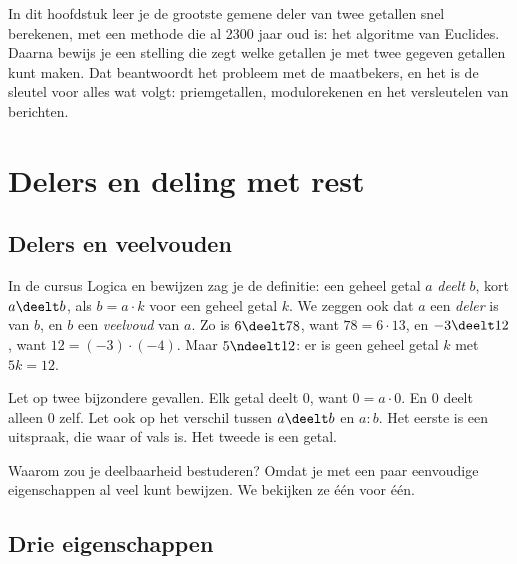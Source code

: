 In dit hoofdstuk leer je de grootste gemene deler van twee getallen snel berekenen, met een methode die al 2300 jaar oud is: het algoritme van Euclides. Daarna bewijs je een stelling die zegt welke getallen je met twee gegeven getallen kunt maken. Dat beantwoordt het probleem met de maatbekers, en het is de sleutel voor alles wat volgt: priemgetallen, modulorekenen en het versleutelen van berichten.

\begin{oefeningen}[Start]

\end{oefeningen}


\section{Delers en deling met rest}

\subsection{Delers en veelvouden}

In de cursus Logica en bewijzen zag je de definitie: een geheel getal $a$ \emph{deelt} $b$, kort $a \deelt b$, als $b = a \cdot k$ voor een geheel getal $k$. We zeggen ook dat $a$ een \emph{deler} is van $b$, en $b$ een \emph{veelvoud} van $a$. Zo is $6 \deelt 78$, want $78 = 6 \cdot 13$, en $-3 \deelt 12$, want $12 = (-3) \cdot (-4)$. Maar $5 \ndeelt 12$: er is geen geheel getal $k$ met $5k = 12$.

Let op twee bijzondere gevallen. Elk getal deelt 0, want $0 = a \cdot 0$. En 0 deelt alleen 0 zelf. Let ook op het verschil tussen $a \deelt b$ en $a : b$. Het eerste is een uitspraak, die waar of vals is. Het tweede is een getal.

Waarom zou je deelbaarheid bestuderen? Omdat je met een paar eenvoudige eigenschappen al veel kunt bewijzen. We bekijken ze één voor één.

\subsection{Drie eigenschappen}

